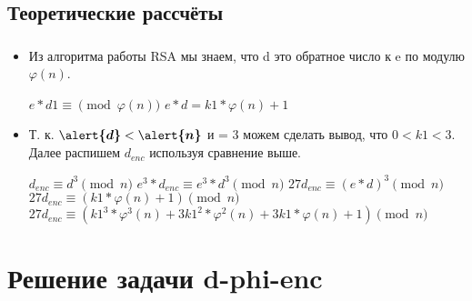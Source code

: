 \documentclass[t]{beamer}
\begin{document}
\subsection{Теоретические рассчёты}
\begin{frame}[t] %
	\frametitle{\insertsection}
	\framesubtitle{\insertsubsection}
	\begin{itemize}
		\item Из алгоритма работы RSA мы знаем, что d это обратное число к e по          модулю $\varphi(n)$.\newline
            \begin{center}
                \( e*d1 \equiv \pmod{\varphi(n)} \)\newline
                \( e*d = k1*\varphi(n) +1 \)\newline
            \end{center}
            \item Т. к. $\boldsymbol{\alert{d}} < \boldsymbol{\alert{n}}$ и  = 3 можем сделать вывод, что $0 < k1 < 3$. Далее распишем $d_{enc}$ используя сравнение выше.\newline
            \begin{center}
                \( d_{enc} \equiv d^3 \pmod{n} \)\newline
                \( e^3*d_{enc} \equiv e^3*d^3 \pmod{n} \)\newline
                \( 27d_{enc} \equiv (e*d)^3 \pmod{n} \)\newline
                \( 27d_{enc} \equiv (k1*\varphi(n) +1) \pmod{n} \)\newline
                \( 27d_{enc} \equiv (k1^3*\varphi^3(n) + 3k1^2*\varphi^2(n) + 3k1*\varphi(n) + 1) \pmod{n} \)\newline
		\end{center}
	\end{itemize}
\end{frame}

\section{Решение задачи d-phi-enc}
\end{document}
